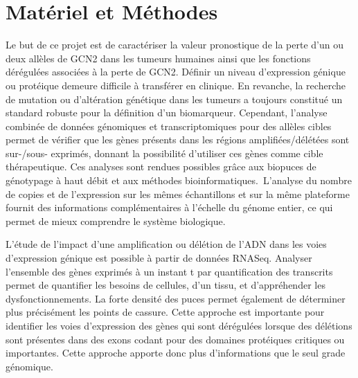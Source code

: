 \documentclass{style}
\begin{document}
\newpage
\section{Matériel et Méthodes}
Le but de ce projet est de caractériser la valeur pronostique de la perte d’un ou deux allèles de GCN2 dans les tumeurs humaines ainsi que les fonctions dérégulées associées à la perte de GCN2. 
Définir un niveau d'expression génique ou protéique demeure difficile à transférer en clinique. En revanche, la recherche de mutation ou d’altération génétique dans les tumeurs a toujours constitué un standard robuste pour la définition d’un biomarqueur. Cependant, l’analyse combinée de données génomiques et transcriptomiques pour des allèles cibles permet de vérifier que les gènes présents dans les régions amplifiées/délétées sont sur-/sous- exprimés, donnant la possibilité d’utiliser ces gènes comme cible thérapeutique. Ces analyses sont rendues possibles grâce aux biopuces de génotypage à haut débit et aux méthodes bioinformatiques.\
L'analyse du nombre de copies et de l'expression sur les mêmes échantillons et sur la même plateforme fournit des informations complémentaires à l'échelle du génome entier, ce qui permet de mieux comprendre le système biologique.

L’étude de l’impact d’une amplification ou délétion de l’ADN dans les voies d’expression génique est possible à partir de données RNASeq. Analyser l’ensemble des gènes exprimés à un instant t par quantification des transcrits permet de quantifier les besoins de cellules, d’un tissu, et d’appréhender les dysfonctionnements. La forte densité des puces permet également de déterminer plus précisément les points de cassure. Cette approche est importante pour identifier les voies d'expression des gènes qui sont dérégulées lorsque des délétions sont présentes dans des exons codant pour des domaines protéiques critiques ou importantes. Cette approche apporte donc plus d’informations que le seul grade génomique.
\end{document}
